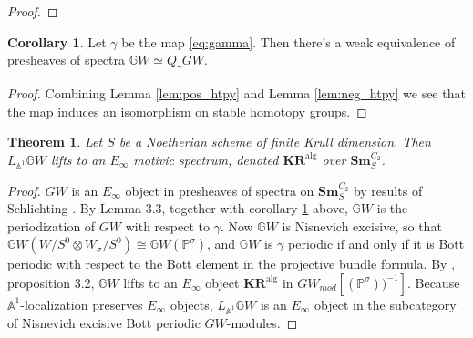 \documentclass[edeposit,fullpage]{uiucthesis2009}
\newcommand{\Z}{\mathbb Z}
\newcommand{\mbb}{\mathbb}
\newcommand{\Sm}[1]{\mathbf{Sm}_{#1}}
\newcommand{\KR}{\mathbf{KR}^{\mathrm{alg}}}
\theoremstyle{plain}
\numberwithin{lemma}{section}
\newtheorem{theorem}[lemma]{Theorem}
\theoremstyle{definition}
\newtheorem{corollary}[lemma]{Corollary}
\begin{document}
\begin{proof}

 \end{proof}

\begin{corollary}\label{cor:GW_per}
Let $\gamma$ be the map \eqref{eq:gamma}. Then there's a weak
equivalence of presheaves of spectra $\mbb GW \simeq Q_\gamma GW$.
\end{corollary}

\begin{proof}
Combining Lemma \ref{lem:pos_htpy} and Lemma \ref{lem:neg_htpy} we see
that the map induces an isomorphism on stable homotopy groups. 
\end{proof}


\begin{theorem}\label{thm:GW_Einfty}
Let $S$ be a Noetherian scheme of finite Krull dimension. Then $L_{\mbb A^1}\mbb GW$ lifts to an $E_\infty$ motivic spectrum, denoted
$\KR$ over $\Sm{S}^{C_2}$.
\end{theorem}

\begin{proof}
$GW$ is an $E_\infty$ object in presheaves of spectra on
$\Sm{S}^{C_2}$ by results of Schlichting \cite{Schder}. By
\cite{cdhdesc} Lemma 3.3, together with corollary \ref{cor:GW_per}
above, $\mbb GW$ is the periodization of $GW$ with respect to
$\gamma$. Now $\mbb GW$ is Nisnevich excisive, so that $\mbb GW(W/S^0
\otimes W_\sigma/S^0) \cong \mbb GW(\mbb P^\sigma)$, and $\mbb GW$ is
$\gamma$ periodic if and only if it is Bott periodic with respect to
the Bott element in the projective bundle formula. By \cite{cdhdesc}, proposition 3.2, $\mbb GW$ lifts to an
$E_\infty$ object $\KR$ in $GW_{mod}[(\mbb P^\sigma))^{-1}]$. Because $\mbb A^1$-localization preserves
$E_\infty$ objects, $L_{\mbb A^1}\mbb GW$ is an $E_\infty$ object in
the subcategory of Nisnevich excisive Bott periodic
$GW$-modules. 
\end{proof}
\end{document}
